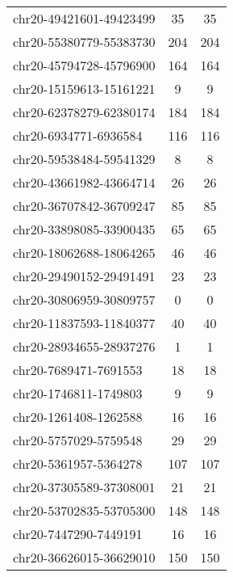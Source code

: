 \begin{longtable}{lSS}
	chr20-49421601-49423499 & 35   & 35                              \\
	chr20-55380779-55383730 & 204  & 204                             \\
	chr20-45794728-45796900 & 164  & 164                             \\
	chr20-15159613-15161221 & 9    & 9                               \\
	chr20-62378279-62380174 & 184  & 184                             \\
	chr20-6934771-6936584   & 116  & 116                             \\
	chr20-59538484-59541329 & 8    & 8                               \\
	chr20-43661982-43664714 & 26   & 26                              \\
	chr20-36707842-36709247 & 85   & 85                              \\
	chr20-33898085-33900435 & 65   & 65                              \\
	chr20-18062688-18064265 & 46   & 46                              \\
	chr20-29490152-29491491 & 23   & 23                              \\
	chr20-30806959-30809757 & 0    & 0                               \\
	chr20-11837593-11840377 & 40   & 40                              \\
	chr20-28934655-28937276 & 1    & 1                               \\
	chr20-7689471-7691553   & 18   & 18                              \\
	chr20-1746811-1749803   & 9    & 9                               \\
	chr20-1261408-1262588   & 16   & 16                              \\
	chr20-5757029-5759548   & 29   & 29                              \\
	chr20-5361957-5364278   & 107  & 107                             \\
	chr20-37305589-37308001 & 21   & 21                              \\
	chr20-53702835-53705300 & 148  & 148                             \\
	chr20-7447290-7449191   & 16   & 16                              \\
	chr20-36626015-36629010 & 150  & 150                             \\

\end{longtable}
